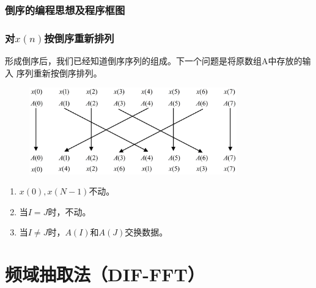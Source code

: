 \documentclass[notheorems,compress,mathserif,table]{beamer}
\begin{document}
\subsubsection{倒序的编程思想及程序框图}
%
%
%
\begin{frame}[shrink]\frametitle{对$x(n)$按倒序重新排列}%
形成倒序后，我们已经知道倒序序列的组成。下一个问题是将原数组A中存放的输入
序列重新按倒序排列。
\begin{figure}[h]
\centering
\includegraphics[width=0.8\textwidth]{daoxuguilv.jpg}
\end{figure}
\begin{enumerate}
  \item $x(0),x(N-1)$不动。
  \item 当$I=J$时，不动。
  \item 当$I\neq J$时，$A(I)$和$A(J)$交换数据。
\end{enumerate}

\end{frame}
%
%
%
\section{频域抽取法（DIF-FFT）}
\end{document}
